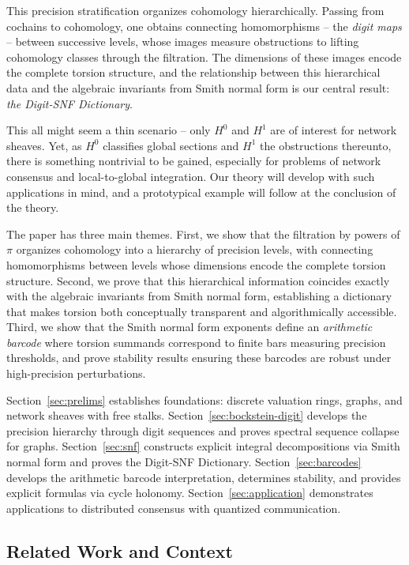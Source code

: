 \documentclass[11pt]{amsart}
\theoremstyle{plain}
\theoremstyle{definition}
\newcommand{\unif}{\pi}                        %
\begin{document}
This precision stratification organizes cohomology hierarchically. Passing from 
cochains to cohomology, one obtains connecting homomorphisms -- the 
\emph{digit maps} -- between successive levels, whose images measure obstructions 
to lifting cohomology classes through the filtration. The dimensions of these 
images encode the complete torsion structure, and the relationship between this 
hierarchical data and the algebraic invariants from Smith normal form is our 
central result: {\em the Digit-SNF Dictionary}.

This all might seem a thin scenario -- only $H^0$ and $H^1$ are of interest for network sheaves. 
Yet, as $H^0$ classifies global sections and $H^1$ the obstructions thereunto, there is something 
nontrivial to be gained, especially for problems of network consensus and local-to-global 
integration. Our theory will develop with such applications in mind, and a prototypical 
example will follow at the conclusion of the theory. 

The paper has three main themes. First, we show that the filtration by powers of 
$\unif$ organizes cohomology into a hierarchy of precision levels, with 
connecting homomorphisms between levels whose dimensions encode the complete 
torsion structure. Second, we prove that this hierarchical information coincides 
exactly with the algebraic invariants from Smith normal form, establishing a 
dictionary that makes torsion both conceptually transparent and algorithmically 
accessible. Third, we show that the Smith normal form exponents define an 
\emph{arithmetic barcode} where torsion summands correspond to finite bars 
measuring precision thresholds, and prove stability results ensuring these 
barcodes are robust under high-precision perturbations.

Section~\ref{sec:prelims} establishes foundations: discrete valuation rings, 
graphs, and network sheaves with free stalks. Section~\ref{sec:bockstein-digit} 
develops the precision hierarchy through digit sequences and proves spectral 
sequence collapse for graphs. Section~\ref{sec:snf} constructs explicit integral 
decompositions via Smith normal form and proves the Digit-SNF Dictionary. 
Section~\ref{sec:barcodes} develops the arithmetic barcode interpretation, 
determines stability, and 
provides explicit formulas via cycle holonomy. Section~\ref{sec:application} 
demonstrates applications to distributed consensus with quantized communication.

\subsection{Related Work and Context}
\label{ssec:related-work}
\end{document}
